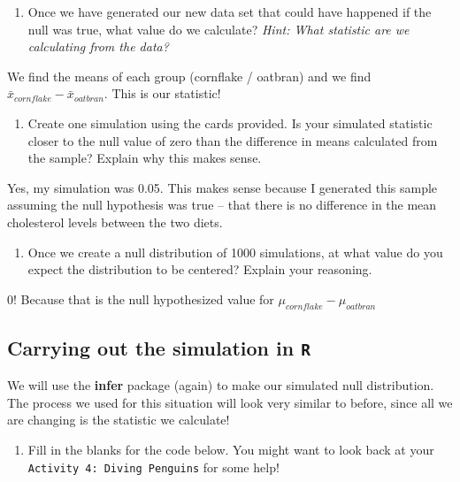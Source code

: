 \documentclass[
  letterpaper,
  DIV=11,
  numbers=noendperiod]{scrartcl}
\providecommand{\tightlist}{%
  \setlength{\itemsep}{0pt}\setlength{\parskip}{0pt}}\usepackage{longtable,booktabs,array}
\begin{document}
\begin{enumerate}
\def\labelenumi{\arabic{enumi}.}
\setcounter{enumi}{18}
\tightlist
\item
  Once we have generated our new data set that could have happened if
  the null was true, what value do we calculate? \emph{Hint: What
  statistic are we calculating from the data?}
\end{enumerate}

We find the means of each group (cornflake / oatbran) and we find
\(\bar{x}_{cornflake} - \bar{x}_{oatbran}\). This is our statistic!

\begin{enumerate}
\def\labelenumi{\arabic{enumi}.}
\setcounter{enumi}{19}
\tightlist
\item
  Create one simulation using the cards provided. Is your simulated
  statistic closer to the null value of zero than the difference in
  means calculated from the sample? Explain why this makes sense.
\end{enumerate}

Yes, my simulation was 0.05. This makes sense because I generated this
sample assuming the null hypothesis was true -- that there is no
difference in the mean cholesterol levels between the two diets.

\begin{enumerate}
\def\labelenumi{\arabic{enumi}.}
\setcounter{enumi}{20}
\tightlist
\item
  Once we create a null distribution of 1000 simulations, at what value
  do you expect the distribution to be centered? Explain your reasoning.
\end{enumerate}

0! Because that is the null hypothesized value for
\(\mu_{cornflake} - \mu_{oatbran}\)

\hypertarget{carrying-out-the-simulation-in-r}{%
\subsection{\texorpdfstring{Carrying out the simulation in
\texttt{R}}{Carrying out the simulation in R}}\label{carrying-out-the-simulation-in-r}}

We will use the \textbf{infer} package (again) to make our simulated
null distribution. The process we used for this situation will look very
similar to before, since all we are changing is the statistic we
calculate!

\begin{enumerate}
\def\labelenumi{\arabic{enumi}.}
\setcounter{enumi}{21}
\tightlist
\item
  Fill in the blanks for the code below. You might want to look back at
  your \texttt{Activity\ 4:\ Diving\ Penguins} for some help!
\end{enumerate}
\end{document}
